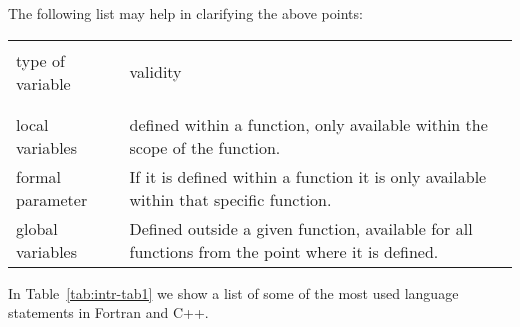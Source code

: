 The following list may help
in clarifying the above points:
\begin{center}
\begin{tabular}{|ll|} \hline
&\\[-3mm]
type of variable & \hspace*{\fill}validity \hspace*{\fill}\\ 
&\\[-3mm] \hline
&\\[-3mm]
local variables & 
\begin{minipage}[t]{0.6\textwidth}
defined within a function, only available within the scope of the function.
 \vspace*{2mm}\end{minipage}\\
formal parameter &
\begin{minipage}[t]{0.6\textwidth}
If it is defined within a function it is only available within that specific
function.
\vspace*{2mm}\end{minipage}\\
global variables &
\begin{minipage}[t]{0.6\textwidth}
Defined outside a given function, available for all 
functions from the point where it is defined.
\vspace*{2mm}\end{minipage}\\
\hline
\end{tabular}
\end{center}
In Table~\ref{tab:intr-tab1} we show a list of some of the most used
language statements in Fortran and C++.
